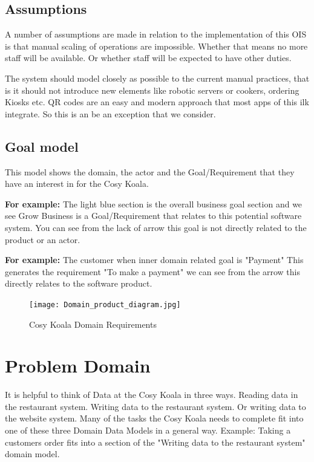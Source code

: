 \documentclass{article}
\begin{document}
\subsection{Assumptions}
A number of assumptions are made in relation to the implementation of this OIS is that manual scaling of operations are impossible. Whether that means no more staff will be available. Or whether staff will be expected to have other duties.

The system should model closely as possible to the current manual practices, that is it should not introduce new elements like robotic servers or cookers, ordering Kiosks etc.
QR codes are an easy and modern approach that most apps of this ilk integrate. So this is an be an exception that we consider.

\clearpage
\subsection{Goal model}
This model shows the domain, the actor and the Goal/Requirement that they have an interest in for the Cosy Koala. 

\textbf{For example:} The light blue section is the overall business goal section and we see Grow Business is a Goal/Requirement that relates to this potential software system. You can see from the lack of arrow this goal is not directly related to the product or an actor.


\textbf{For example:}  The customer when inner domain related goal is "Payment" This generates the requirement "To make a payment" we can see from the arrow this directly relates to the software product.
\begin{figure}[!ht]
    \centering
    \texttt{[image: Domain\_product\_diagram.jpg]}
    \caption{Cosy Koala Domain Requirements}
    \label{fig:Domain_Product}
\end{figure}

\clearpage
\section{Problem Domain}
It is helpful to think of Data at the Cosy Koala in three ways. Reading data in the restaurant system. Writing data to the restaurant system. Or writing data to the website system. 
Many of the tasks the Cosy Koala needs to complete fit into one of these three Domain Data Models in a general way. 
Example: Taking a customers order fits into a section of the "Writing data to the restaurant system" domain model.
\end{document}
